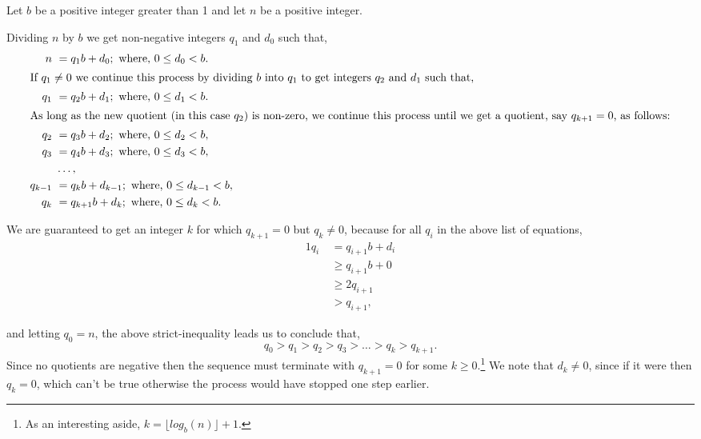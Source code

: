\documentclass{article}
\begin{document}
Let \(b\) be a positive integer greater than 1 and
let \(n\) be a positive integer.

Dividing \(n\) by \(b\) we get non-negative integers \(q_1\) and \(d_0\) such that,
\begin{alignat*}{1}
n\ &= q_1b + d_0; \text{ where, } 0 \le{} d_0 < b.\\
\intertext{If \(q_1 \ne{} 0\) we continue this process by dividing \(b\) into \(q_1\) to get integers \(q_2\) and \(d_1\) such that,}
q_1\ &= q_2b + d_1; \text{ where, } 0 \le{} d_1 < b.\\
\intertext{As long as the new quotient (in this case \(q_2\)) is non-zero, we continue this process
until we get a quotient, say \(q_{k+1} = 0\), as follows:}
q_2\ &= q_3b + d_2; \text{ where, } 0 \le{} d_2 < b,\\
q_3\ &= q_4b + d_3; \text{ where, } 0 \le{} d_3 < b,\\
 &\dots{},\\
q_{k-1}\ &= q_{k}b + d_{k-1}; \text{ where, } 0 \le{} d_{k-1} < b,\\
q_{k}\ &= q_{k+1}b + d_k; \text{ where, } 0 \le{} d_k < b.
\end{alignat*}

We are guaranteed to get an integer \(k\) for which \(q_{k+1} = 0\) but \(q_k \ne{} 0\), because for
all \(q_i\) in the above list of equations,
\begin{alignat*}{1}
q_i\  &= q_{i+1}b + d_i\\
\ &\ge{} q_{i+1}b + 0\\
\ &\ge{} 2q_{i+1}\\
\ &> q_{i+1},
\end{alignat*}

and letting \(q_0 = n\), the above strict-inequality leads us to conclude that,
\[q_0 > q_1 > q_2 > q_3 > \dots{} > q_k > q_{k+1}.\]
Since no quotients are negative then the sequence
must terminate with \(q_{k+1} = 0\) for some \(k \ge{} 0\).\footnote{As an
interesting aside, \(k = {\lfloor}log_b(n){\rfloor} + 1\).} We note that
\(d_k \ne{} 0\), since if it were then \(q_k = 0\), which can't be 
true otherwise the process would have stopped one step earlier.
\end{document}
